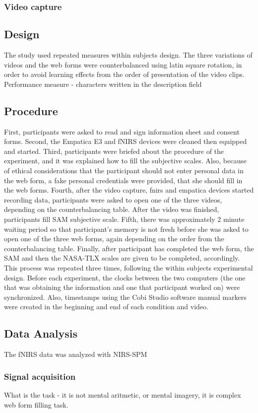 \documentclass[a4paper]{report}
\begin{document}
			\subsubsection{Video capture}
		\subsection{Design}
		The study used repeated measures within subjects design. The three variations of videos and the web forms were counterbalanced using latin square rotation, in order to avoid learning effects from the order of presentation of the video clips.
		Performance measure - characters written in the description field
		\subsection{Procedure}
		First, participants were asked to read and sign information sheet and consent forms. Second, the Empatica E3 and fNIRS devices were cleaned then equipped and started. Third, participants were briefed about the procedure of the experiment, and it was explained how to fill the subjective scales. Also, because of ethical considerations that the participant should not enter personal data in the web form, a fake personal credentials were provided, that she should fill in the web forms. Fourth, after the video capture, fnirs and empatica devices started recording data, participants were asked to open one of the three videos, depending on the counterbalancing table. After the video was finished, participants fill SAM subjective scale. Fifth, there was approximately 2 minute waiting period so that participant's memory is not fresh before she was asked to open one of the three web forms, again depending on the order from the counterbalancing table. Finally, after participant has completed the web form, the SAM and then the NASA-TLX scales are given to be completed, accordingly. This process was repeated three times, following the within subjects experimental design.
		Before each experiment, the clocks between the two computers (the one that was obtaining the information and one that participant worked on) were synchronized. Also, timestamps using the Cobi Studio software manual markers were created in the beginning and end of each condition and video. 
		\subsection{Data Analysis}
		The fNIRS data was analyzed with NIRS-SPM\cite{ye2009nirs}		
			\subsubsection{Signal acquisition}
			What is the task - it is not mental aritmetic, or mental imagery, it is complex web form filling task.
\end{document}
